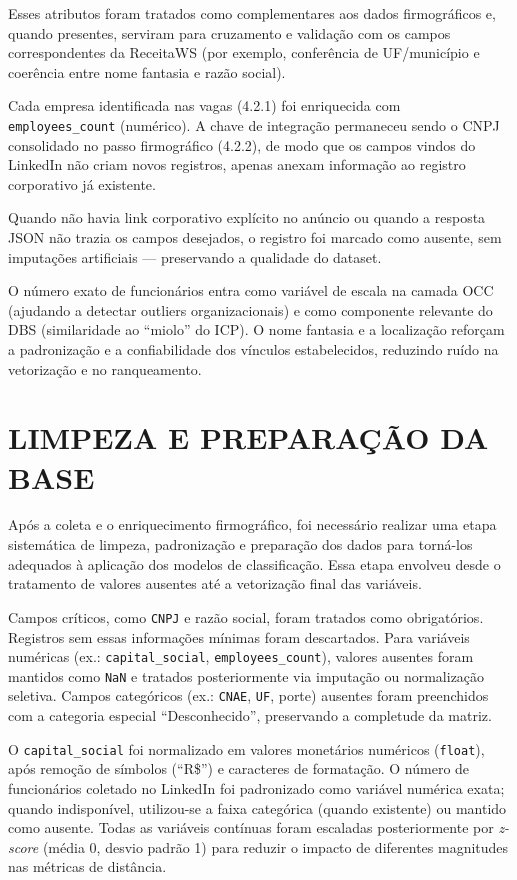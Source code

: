 Esses atributos foram tratados como complementares aos dados firmográficos e, quando presentes, serviram para cruzamento e validação com os campos correspondentes da ReceitaWS (por exemplo, conferência de UF/município e coerência entre nome fantasia e razão social).

Cada empresa identificada nas vagas (4.2.1) foi enriquecida com \texttt{employees\_count} (numérico). A chave de integração permaneceu sendo o CNPJ consolidado no passo firmográfico (4.2.2), de modo que os campos vindos do LinkedIn não criam novos registros, apenas anexam informação ao registro corporativo já existente.

Quando não havia link corporativo explícito no anúncio ou quando a resposta JSON não trazia os campos desejados, o registro foi marcado como ausente, sem imputações artificiais --- preservando a qualidade do dataset.

O número exato de funcionários entra como variável de escala na camada OCC (ajudando a detectar outliers organizacionais) e como componente relevante do DBS (similaridade ao ``miolo'' do ICP). O nome fantasia e a localização reforçam a padronização e a confiabilidade dos vínculos estabelecidos, reduzindo ruído na vetorização e no ranqueamento.

\section{LIMPEZA E PREPARAÇÃO DA BASE}

Após a coleta e o enriquecimento firmográfico, foi necessário realizar uma etapa sistemática de limpeza, padronização e preparação dos dados para torná-los adequados à aplicação dos modelos de classificação. Essa etapa envolveu desde o tratamento de valores ausentes até a vetorização final das variáveis.

Campos críticos, como \texttt{CNPJ} e razão social, foram tratados como obrigatórios. Registros sem essas informações mínimas foram descartados. Para variáveis numéricas (ex.: \texttt{capital\_social}, \texttt{employees\_count}), valores ausentes foram mantidos como \texttt{NaN} e tratados posteriormente via imputação ou normalização seletiva. Campos categóricos (ex.: \texttt{CNAE}, \texttt{UF}, porte) ausentes foram preenchidos com a categoria especial ``Desconhecido'', preservando a completude da matriz.

O \texttt{capital\_social} foi normalizado em valores monetários numéricos (\texttt{float}), após remoção de símbolos (``R\$'') e caracteres de formatação. O número de funcionários coletado no LinkedIn foi padronizado como variável numérica exata; quando indisponível, utilizou-se a faixa categórica (quando existente) ou mantido como ausente. Todas as variáveis contínuas foram escaladas posteriormente por \textit{z-score} (média 0, desvio padrão 1) para reduzir o impacto de diferentes magnitudes nas métricas de distância.

